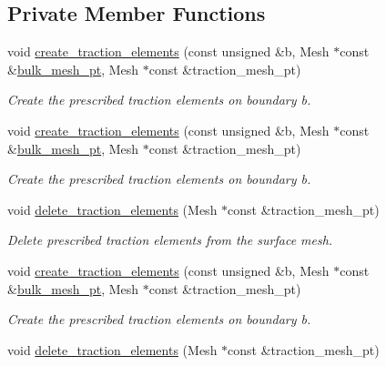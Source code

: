 \subsection*{Private Member Functions}
\begin{DoxyCompactItemize}
\item 
void \hyperlink{classFSICollapsibleChannelProblem_af7352e5fd5ea8965adbc9505749442a3}{create\+\_\+traction\+\_\+elements} (const unsigned \&b, Mesh $\ast$const \&\hyperlink{classFSICollapsibleChannelProblem_a5ea2780b4f97b65b5c122a952093e6c2}{bulk\+\_\+mesh\+\_\+pt}, Mesh $\ast$const \&traction\+\_\+mesh\+\_\+pt)
\begin{DoxyCompactList}\small\item\em Create the prescribed traction elements on boundary b. \end{DoxyCompactList}\item 
void \hyperlink{classFSICollapsibleChannelProblem_af7352e5fd5ea8965adbc9505749442a3}{create\+\_\+traction\+\_\+elements} (const unsigned \&b, Mesh $\ast$const \&\hyperlink{classFSICollapsibleChannelProblem_a5ea2780b4f97b65b5c122a952093e6c2}{bulk\+\_\+mesh\+\_\+pt}, Mesh $\ast$const \&traction\+\_\+mesh\+\_\+pt)
\begin{DoxyCompactList}\small\item\em Create the prescribed traction elements on boundary b. \end{DoxyCompactList}\item 
void \hyperlink{classFSICollapsibleChannelProblem_af1848415423aa824b91357922905a18f}{delete\+\_\+traction\+\_\+elements} (Mesh $\ast$const \&traction\+\_\+mesh\+\_\+pt)
\begin{DoxyCompactList}\small\item\em Delete prescribed traction elements from the surface mesh. \end{DoxyCompactList}\item 
void \hyperlink{classFSICollapsibleChannelProblem_af7352e5fd5ea8965adbc9505749442a3}{create\+\_\+traction\+\_\+elements} (const unsigned \&b, Mesh $\ast$const \&\hyperlink{classFSICollapsibleChannelProblem_a5ea2780b4f97b65b5c122a952093e6c2}{bulk\+\_\+mesh\+\_\+pt}, Mesh $\ast$const \&traction\+\_\+mesh\+\_\+pt)
\begin{DoxyCompactList}\small\item\em Create the prescribed traction elements on boundary b. \end{DoxyCompactList}\item 
void \hyperlink{classFSICollapsibleChannelProblem_af1848415423aa824b91357922905a18f}{delete\+\_\+traction\+\_\+elements} (Mesh $\ast$const \&traction\+\_\+mesh\+\_\+pt)

\end{DoxyCompactItemize}
